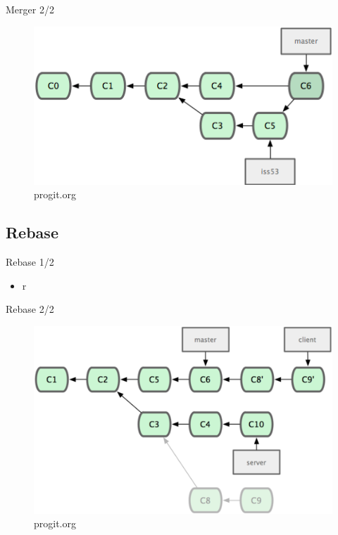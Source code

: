 \documentclass{beamer}
\begin{document}
\begin{frame}{Merger 2/2}
  \begin{figure}
    \begin{center}
      \includegraphics[scale=0.7]{img/Merge.png}
    \end{center}
    \caption{progit.org}
  \end{figure}
\end{frame}

\subsection*{Rebase}
\begin{frame}{Rebase 1/2}
  \begin{itemize}
  \item r
  \end{itemize}
\end{frame}

\begin{frame}{Rebase 2/2}
  \begin{figure}
    \begin{center}
    \includegraphics[scale=0.7]{img/Rebase.png}
    \end{center}
    \caption{progit.org}
  \end{figure}
\end{frame}
\end{document}
